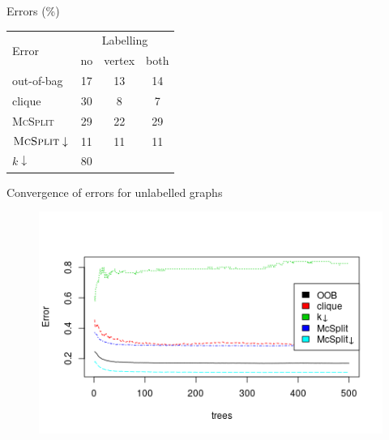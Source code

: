 \documentclass{beamer}
\begin{document}
\begin{frame}{Errors (\%)}
  \centering
  \begin{tabular}{l | c c c}
    \multirow{2}{*}{Error} & \multicolumn{3}{c}{Labelling} \\
                           & no & vertex & both \\
    \hline
    out-of-bag & 17 & 13 & 14 \\
    clique & 30 & 8 & 7 \\
    \textsc{McSplit} & 29 & 22 & 29 \\
    $\textsc{McSplit}\downarrow$ & 11 & 11 & 11 \\
    $k\downarrow$ & 80 & &
  \end{tabular}
\end{frame}

\begin{frame}{Convergence of errors for unlabelled graphs}
  \begin{figure}
    \centering
    \includegraphics[scale=0.5]{../dissertation/images/unlabelled_forest_errors.png}
  \end{figure}
\end{frame}
\end{document}
